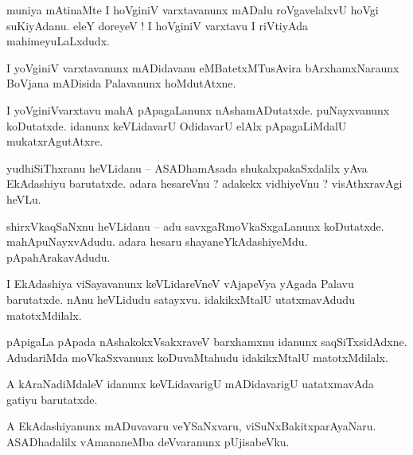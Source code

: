 \documentclass{article}
\begin{document}
\begin{mn}%
muniya mAtinaMte I hoVginiV varxtavanunx mADalu roVgavelalxvU hoVgi suKiyAdanu. eleY doreyeV ! I 
hoVginiV varxtavu I riVtiyAda mahimeyuLaLxdudx.
\end{mn}

\begin{mn}%
I yoVginiV varxtavanunx mADidavanu eMBatetxMTusAvira bArxhamxNaraunx BoVjana mADisida Palavanunx 
hoMdutAtxne.
\end{mn}

\begin{mn}%
I yoVginiVvarxtavu mahA pApagaLanunx nAshamADutatxde. puNayxvanunx koDutatxde. idanunx keVLidavarU 
OdidavarU elAlx pApagaLiMdalU mukatxrAgutAtxre.
\end{mn}


\begin{mn}%
yudhiSiThxranu heVLidanu -- ASADhamAsada shukalxpakaSxdalilx yAva EkAdashiyu barutatxde. adara 
hesareVnu ? adakekx vidhiyeVnu ? visAthxravAgi heVLu.
\end{mn}

\begin{mn}%
shirxVkaqSaNxnu heVLidanu -- adu savxgaRmoVkaSxgaLanunx koDutatxde. mahApuNayxvAdudu. adara hesaru 
shayaneYkAdashiyeMdu. pApahArakavAdudu.
\end{mn}

\begin{mn}%
I EkAdashiya viSayavanunx keVLidareVneV vAjapeVya yAgada Palavu barutatxde. nAnu heVLidudu 
satayxvu. idakikxMtalU utatxmavAdudu matotxMdilalx.
\end{mn}

\begin{mn}%
pApigaLa pApada nAshakokxVsakxraveV barxhamxnu idanunx saqSiTxsidAdxne. AdudariMda moVkaSxvanunx 
koDuvaMtahudu idakikxMtalU matotxMdilalx.
\end{mn}

\begin{mn}%
A kAraNadiMdaleV idanunx keVLidavarigU mADidavarigU uatatxmavAda gatiyu barutatxde.
\end{mn}

\begin{mn}%
A EkAdashiyanunx mADuvavaru veYSaNxvaru, viSuNxBakitxparAyaNaru. ASADhadalilx vAmananeMba 
deVvaranunx pUjisabeVku.
\end{mn}
\end{document}
